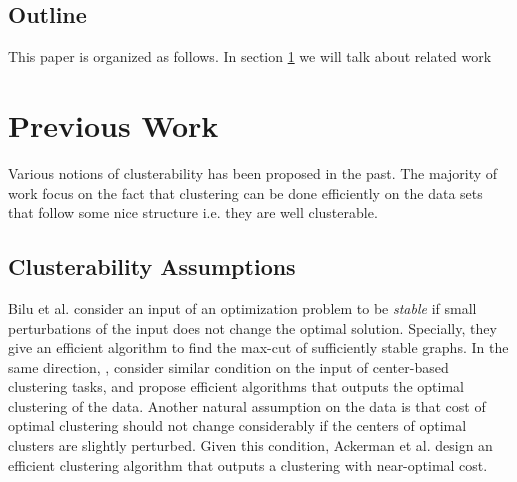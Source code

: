 \documentclass[twoside]{article}
\begin{document}
\subsection{Outline}
This paper is organized as follows. In section \ref{sec:previous} we will talk about related work
\section{Previous Work}
\label{sec:previous}

Various notions of clusterability has been proposed in the past. The majority of work focus on the fact that clustering can be done efficiently on the data sets that follow some nice structure i.e. they are well clusterable.

\subsection{Clusterability Assumptions}


Bilu et al. \cite{bilu2012stable} consider an input of an optimization problem to be \emph{stable} if small perturbations of the input does not change the optimal solution. Specially, they give an efficient algorithm to find the max-cut of sufficiently stable graphs.
In the same direction, \cite{awasthi2012center, balcan2012clustering}, consider similar condition on the input of center-based clustering tasks, and propose efficient algorithms that outputs the optimal clustering of the data. Another natural assumption \cite{ackerman2009clusterability} on the data is that cost of optimal clustering should not change considerably if the centers of optimal clusters are slightly perturbed. Given this condition, Ackerman et al. design an efficient clustering algorithm that outputs a clustering with near-optimal cost. 
\end{document}
